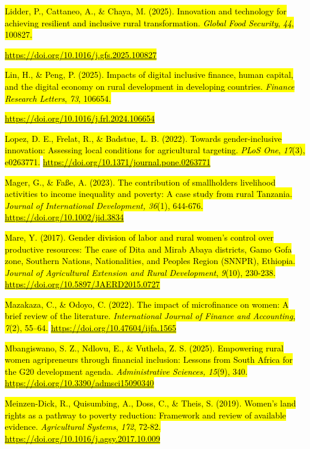 \documentclass[
]{article}
\begin{document}
\hl{Lidder, P., Cattaneo, A., \& Chaya, M. (2025). Innovation and
technology for achieving resilient and inclusive rural transformation.
\emph{Global Food Security}, \emph{44}, 100827.}

\href{https://doi.org/10.1016/j.gfs.2025.100827}{\hl{https://doi.org/10.1016/j.gfs.2025.100827}}

\hl{Lin, H., \& Peng, P. (2025). Impacts of digital inclusive finance,
human capital, and the digital economy on rural development in
developing countries. \emph{Finance Research Letters}, \emph{73},
106654.}

\href{https://doi.org/10.1016/j.frl.2024.106654}{\hl{https://doi.org/10.1016/j.frl.2024.106654}}

\hl{Lopez, D. E., Frelat, R., \& Badstue, L. B. (2022). Towards
gender-inclusive innovation: Assessing local conditions for agricultural
targeting. \emph{PLoS One}, \emph{17}(3), e0263771.}
\href{https://doi.org/10.1371/journal.pone.0263771}{\hl{https://doi.org/10.1371/journal.pone.0263771}}

\hl{Mager, G., \& Faße, A. (2023). The contribution of
smallholders\textquotesingle{} livelihood activities to income
inequality and poverty: A case study from rural Tanzania. \emph{Journal
of International Development, 36}(1), 644-676.}
\href{https://doi.org/10.1002\%2Fjid.3834}{\hl{https://doi.org/10.1002/jid.3834}}

\hl{Mare, Y. (2017). Gender division of labor and rural women's control
over productive resources: The case of Dita and Mirab Abaya districts,
Gamo Gofa zone, Southern Nations, Nationalities, and Peoples Region
(SNNPR), Ethiopia. \emph{Journal of Agricultural Extension and Rural
Development}, \emph{9}(10), 230-238.}
\href{https://doi.org/10.5897/JAERD2015.0727}{\hl{https://doi.org/10.5897/JAERD2015.0727}}

\hl{Mazakaza, C., \& Odoyo, C. (2022). The impact of microfinance on
women: A brief review of the literature. \emph{International Journal of
Finance and Accounting}, \emph{7}(2), 55--64.}
\href{https://doi.org/10.47604/ijfa.1565}{\hl{https://doi.org/10.47604/ijfa.1565}}

\hl{Mbangiswano, S. Z., Ndlovu, E., \& Vuthela, Z. S. (2025). Empowering
rural women agripreneurs through financial inclusion: Lessons from South
Africa for the G20 development agenda. \emph{Administrative Sciences,
15}(9), 340.}
\href{https://doi.org/10.3390/admsci15090340}{\hl{https://doi.org/10.3390/admsci15090340}}

\hl{Meinzen-Dick, R., Quisumbing, A., Doss, C., \& Theis, S. (2019).
Women's land rights as a pathway to poverty reduction: Framework and
review of available evidence. \emph{Agricultural Systems}, \emph{172},
72-82.}
\href{https://doi.org/10.1016/j.agsy.2017.10.009}{\hl{https://doi.org/10.1016/j.agsy.2017.10.009}}
\end{document}
